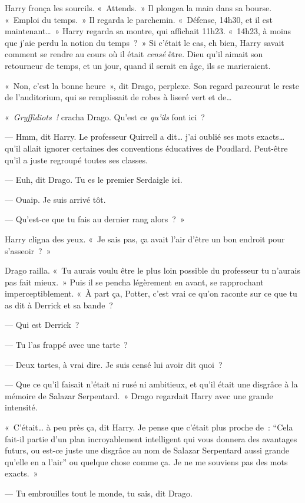 Harry fronça les sourcils. «~Attends.~» Il plongea la main dans sa bourse.
«~Emploi du temps.~» Il regarda le parchemin.
«~Défense, 14h30, et il est maintenant…~» Harry regarda sa montre, qui affichait 11h23.
«~14h23, à moins que j'aie perdu la notion du temps~?~»
Si c'était le cas, eh bien, Harry savait comment se rendre au cours où il était \emph{censé} être.
Dieu qu'il aimait son retourneur de temps, et un jour, quand il serait en âge, ils se marieraient.

«~Non, c'est la bonne heure~», dit Drago, perplexe.
Son regard parcourut le reste de l'auditorium, qui se remplissait de robes à liseré vert et de…

«~\emph{Gryffidiots~!} cracha Drago. Qu'est ce \emph{qu'ils} font ici~?

--- Hmm, dit Harry. Le professeur Quirrell a dit… j'ai oublié ses mots exacts… qu'il allait ignorer certaines des conventions éducatives de Poudlard.
Peut-être qu'il a juste regroupé toutes ses classes.

--- Euh, dit Drago. Tu es le premier Serdaigle ici.

--- Ouaip. Je suis arrivé tôt.

--- Qu'est-ce que tu fais au dernier rang alors~?~»

Harry cligna des yeux. «~Je sais pas, ça avait l'air d'être un bon endroit pour s'asseoir~?~»

Drago railla. «~Tu aurais voulu être le plus loin possible du professeur tu n'aurais pas fait mieux.~»
Puis il se pencha légèrement en avant, se rapprochant imperceptiblement.
«~À part ça, Potter, c'est vrai ce qu'on raconte sur ce que tu as dit à Derrick et sa bande~?

--- Qui est Derrick~?

--- Tu l'as frappé avec une tarte~?

--- Deux tartes, à vrai dire. Je suis censé lui avoir dit quoi~?

--- Que ce qu'il faisait n'était ni rusé ni ambitieux, et qu'il était une disgrâce à la mémoire de Salazar Serpentard.~»
Drago regardait Harry avec une grande intensité.

«~C'était… à peu près ça, dit Harry. Je pense que c'était plus proche de~: “Cela fait-il partie d'un plan incroyablement intelligent qui vous donnera des avantages futurs, ou est-ce juste une disgrâce au nom de Salazar Serpentard aussi grande qu'elle en a l'air”
ou quelque chose comme ça. Je ne me souviens pas des mots exacts.~»

--- Tu embrouilles tout le monde, tu sais, dit Drago.

